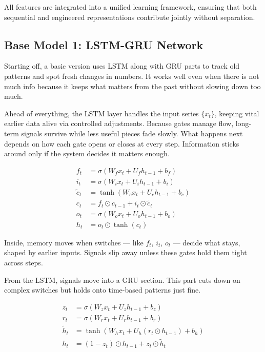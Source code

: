 \documentclass[conference]{IEEEtran}
\begin{document}
All features are integrated into a unified learning framework, ensuring that both sequential and engineered representations contribute jointly without separation.

\subsection{Base Model 1: LSTM-GRU Network}

Starting off, a basic version uses LSTM along with GRU parts to track old patterns and spot fresh changes in numbers. It works well even when there is not much info because it keeps what matters from the past without slowing down too much.

Ahead of everything, the LSTM layer handles the input series $\{x_t\}$, keeping vital earlier data alive via controlled adjustments. Because gates manage flow, long-term signals survive while less useful pieces fade slowly. What happens next depends on how each gate opens or closes at every step. Information sticks around only if the system decides it matters enough.

\begin{align}
f_t &= \sigma(W_f x_t + U_f h_{t-1} + b_f) \\
i_t &= \sigma(W_i x_t + U_i h_{t-1} + b_i) \\
\tilde{c}_t &= \tanh(W_c x_t + U_c h_{t-1} + b_c) \\
c_t &= f_t \odot c_{t-1} + i_t \odot \tilde{c}_t \\
o_t &= \sigma(W_o x_t + U_o h_{t-1} + b_o) \\
h_t &= o_t \odot \tanh(c_t)
\end{align}

Inside, memory moves when switches — like $f_t$, $i_t$, $o_t$ — decide what stays, shaped by earlier inputs. Signals slip away unless these gates hold them tight across steps.

From the LSTM, signals move into a GRU section. This part cuts down on complex switches but holds onto time-based patterns just fine.

\begin{align}
z_t &= \sigma(W_z x_t + U_z h_{t-1} + b_z) \\
r_t &= \sigma(W_r x_t + U_r h_{t-1} + b_r) \\
\tilde{h}_t &= \tanh(W_h x_t + U_h (r_t \odot h_{t-1}) + b_h) \\
h_t &= (1 - z_t) \odot h_{t-1} + z_t \odot \tilde{h}_t
\end{align}
\end{document}

